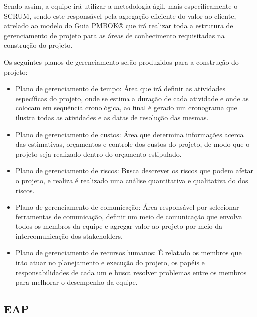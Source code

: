 Sendo assim, a equipe irá utilizar a metodologia ágil, mais especificamente o SCRUM, sendo este responsável pela agregação eficiente do valor ao cliente, atrelado ao modelo do Guia PMBOK® que irá realizar toda a estrutura de gerenciamento de projeto para as áreas de conhecimento requisitadas na construção do projeto.

Os seguintes planos de gerenciamento serão produzidos para a construção do projeto:

\begin{itemize}
	
	\item Plano de gerenciamento de tempo: Área que irá definir as atividades específicas do projeto, onde se estima a duração de cada atividade e onde as colocam em sequência cronológica, ao final é gerado um cronograma que ilustra todas as atividades e as datas de resolução das mesmas.
	
	\item Plano de gerenciamento de custos: Área que determina informações acerca das estimativas, orçamentos e controle dos custos do projeto, de modo que o projeto seja realizado dentro do orçamento estipulado.
	
	\item Plano de gerenciamento de riscos: Busca descrever os riscos que podem afetar o projeto, e realiza é realizado uma análise quantitativa e qualitativa do dos riscos.
	
	\item Plano de gerenciamento de comunicação: Área responsável por selecionar ferramentas de comunicação, definir um meio de comunicação que envolva todos os membros da equipe e agregar valor ao projeto por meio da intercomunicação dos stakeholders.
	
	\item Plano de gerenciamento de recursos humanos: É relatado os membros que irão atuar no planejamento e execução do projeto, os papéis e responsabilidades de cada um e busca resolver problemas entre os membros para melhorar o desempenho da equipe.
	
\end{itemize}

\subsection{EAP}

